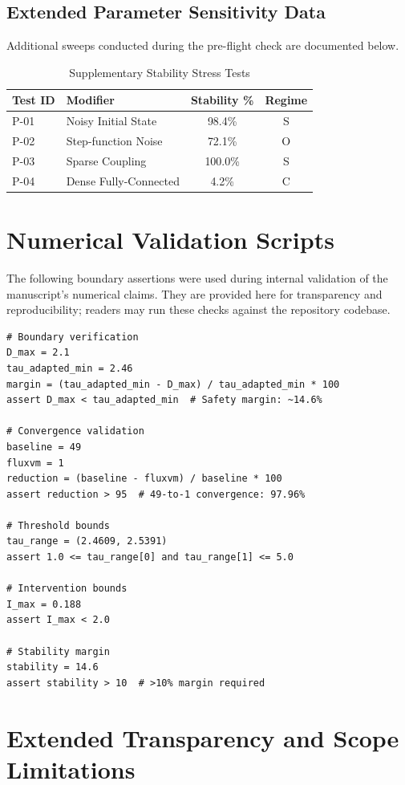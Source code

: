 \documentclass{article}
\begin{document}
\subsection{Extended Parameter Sensitivity Data}
Additional sweeps conducted during the pre-flight check are documented below.
\begin{table}[h]
\centering
\begin{tabular}{|l|l|c|c|}
\hline
\textbf{Test ID} & \textbf{Modifier} & \textbf{Stability \%} & \textbf{Regime} \\ \hline
P-01 & Noisy Initial State & 98.4\% & S \\ \hline
P-02 & Step-function Noise & 72.1\% & O \\ \hline
P-03 & Sparse Coupling & 100.0\% & S \\ \hline
P-04 & Dense Fully-Connected & 4.2\% & C \\ \hline
\end{tabular}
\caption{Supplementary Stability Stress Tests}
\end{table}

\section{Numerical Validation Scripts}
\label{sec:validation_scripts}

The following boundary assertions were used during internal validation of the manuscript's numerical claims. They are provided here for transparency and reproducibility; readers may run these checks against the repository codebase.

\begin{verbatim}
# Boundary verification
D_max = 2.1
tau_adapted_min = 2.46
margin = (tau_adapted_min - D_max) / tau_adapted_min * 100
assert D_max < tau_adapted_min  # Safety margin: ~14.6%

# Convergence validation
baseline = 49
fluxvm = 1
reduction = (baseline - fluxvm) / baseline * 100
assert reduction > 95  # 49-to-1 convergence: 97.96%

# Threshold bounds
tau_range = (2.4609, 2.5391)
assert 1.0 <= tau_range[0] and tau_range[1] <= 5.0

# Intervention bounds
I_max = 0.188
assert I_max < 2.0

# Stability margin
stability = 14.6
assert stability > 10  # >10% margin required
\end{verbatim}


\section{Extended Transparency and Scope Limitations}
\label{sec:transparency}
\end{document}

